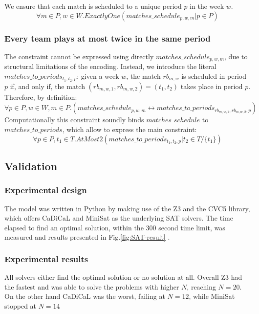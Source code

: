 We ensure that each match is scheduled to a unique period $p$ in the week $w$.
$$
    \forall m \in P, w \in W. ExactlyOne(matches\_schedule_{p, w, m} | p \in P)
$$
\subsubsection{Every team plays at most twice in the same period}
The constraint cannot be expressed using directly $matches\_schedule_{p, w, m}$, due to structural limitations of the encoding. 
Instead, we introduce the literal $matches\_to\_periods_{t_1, t_2, p}$: given a week $w$, the match $rb_{m,w}$ is scheduled in period $p$ if, and only if, the match $(rb_{m, w, 1}, rb_{m, w, 2}) = (t_1, t_2)$ takes place in period $p$. Therefore, by definition: 
$$
    \forall p \in P, w \in W, m \in P.(matches\_schedule_{p, w, m} \leftrightarrow matches\_to\_periods_{rb_{m, w, 1}, rb_{m, w, 2}, p})
$$
Computationally this constraint soundly binds $matches\_schedule$ to \\$matches\_to\_periods$, which allow to express the main constraint:
$$
    \forall p \in P, t_1 \in T. AtMost2(matches\_to\_periods_{t_1, t_2, p} | t_2 \in T/\{t_1\})
$$
\subsection{Validation}
\subsubsection{Experimental design}
The model was written in Python by making use of the Z3 and the CVC5 library, which offers CaDiCaL and MiniSat as the underlying SAT solvers. The time elapsed to find an optimal solution, within the 300 second time limit, was measured and results presented in Fig.\ref{fig:SAT-result} . 
\subsubsection{Experimental results}
All solvers either find the optimal solution or no solution at all. Overall Z3 had the fastest and was able to solve the problems with higher $N$, reaching $N=20$. On the other hand CaDiCaL was the worst, failing at $N=12$, while MiniSat stopped at $N=14$

